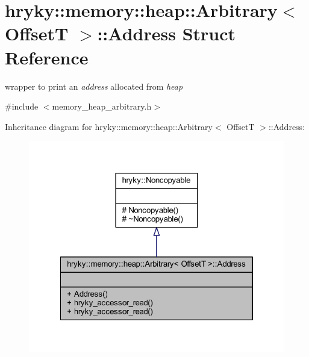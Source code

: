 \hypertarget{structhryky_1_1memory_1_1heap_1_1_arbitrary_1_1_address}{\section{hryky\-:\-:memory\-:\-:heap\-:\-:Arbitrary$<$ Offset\-T $>$\-:\-:Address Struct Reference}
\label{structhryky_1_1memory_1_1heap_1_1_arbitrary_1_1_address}
}


wrapper to print an {\itshape address\/} allocated from {\itshape heap\/}  




{\ttfamily \#include $<$memory\-\_\-heap\-\_\-arbitrary.\-h$>$}



Inheritance diagram for hryky\-:\-:memory\-:\-:heap\-:\-:Arbitrary$<$ Offset\-T $>$\-:\-:Address\-:\nopagebreak
\begin{figure}[H]
\begin{center}
\leavevmode
\includegraphics[width=322pt]{structhryky_1_1memory_1_1heap_1_1_arbitrary_1_1_address__inherit__graph}
\end{center}
\end{figure}
